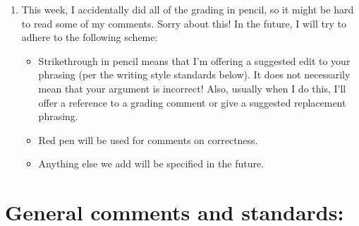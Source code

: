 \documentclass{fkpset}
\begin{document}
\begin{enumerate}[label=(\arabic*)]
    are as follows:
    \begin{itemize}
      \item $\mb{An}$ comments are about style/formatting standards for
        mathematical writing. This is something we've decided to emphasize, so
        consider skimming them each week even if you didn't receive a comment!
      \item Labels of the form $\mb{Bn}$ will refer to comments about the
        correctness of your proof.
      \item Labels of the form $\mb{Cn}$ are usually just some comments on
        notational standards / \LaTeX\ tips (if applicable). You might not see
        these every week.
    \end{itemize}
    When grading your homeworks, I tried to stay consistent with the comment
    labeling scheme given above. However, I do make mistakes sometimes, so if
    something looks funny, don't hesitate to send me an email!
  \item This week, I accidentally did all of the grading in pencil, so it might
    be hard to read some of my comments. Sorry about this! In the future, I will
    try to adhere to the following scheme:
    \begin{itemize}
      \item Strikethrough in pencil means that I'm offering a suggested edit to
        your phrasing (per the writing style standards below). It does not
        necessarily mean that your argument is incorrect! Also, usually when I
        do this, I'll offer a reference to a grading comment or give a suggested
        replacement phrasing.
      \item Red pen will be used for comments on correctness.
      \item Anything else we add will be specified in the future.
    \end{itemize}
\end{enumerate}

\vspace{2em}

\section{General comments and standards:}
\end{document}
